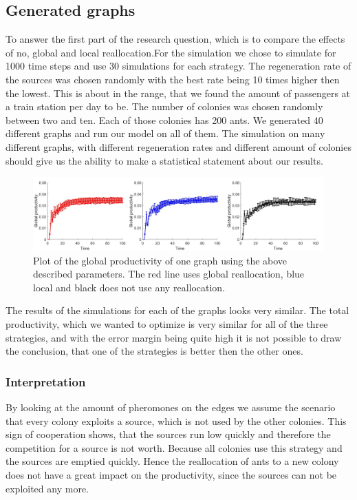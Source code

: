 \subsection{Generated graphs} \label{results1}
To answer the first part of the research question, which is to compare the effects of no, global and local reallocation.For the simulation we chose to simulate for 1000 time steps and use 30 simulations for each strategy. The regeneration rate of the sources was chosen randomly with the best rate being 10 times higher then the lowest. This is about in the range, that we found the amount of passengers at a train station per day to be. The number of colonies was chosen randomly between two and ten. Each of those colonies has 200 ants. We generated 40 different graphs and run our model on all of them. The simulation on many different graphs, with different regeneration rates and different amount of colonies should give us the ability to make a statistical statement about our results.

\begin{figure}[H]
	\centering
	\includegraphics[scale=0.5]{globalProductivity.pdf}
	\caption{Plot of the global productivity of one graph using the above described parameters. The red line uses global reallocation, blue local and black does not use any reallocation.}
\end{figure}
The results of the simulations for each of the graphs looks very similar. The total productivity, which we wanted to optimize is very similar for all of the three strategies, and with the error margin being quite high it is not possible to draw the conclusion, that one of the strategies is better then the other ones. 
\subsubsection{Interpretation}
By looking at the amount of pheromones on the edges we assume the scenario that every colony exploits a source, which is not used by the other colonies. This sign of cooperation shows, that the sources run low quickly and therefore the competition for a source is not worth. Because all colonies use this strategy and the sources are emptied quickly. Hence the reallocation of ants to a new colony does not have a great impact on the productivity, since the sources can not be exploited any more. 

